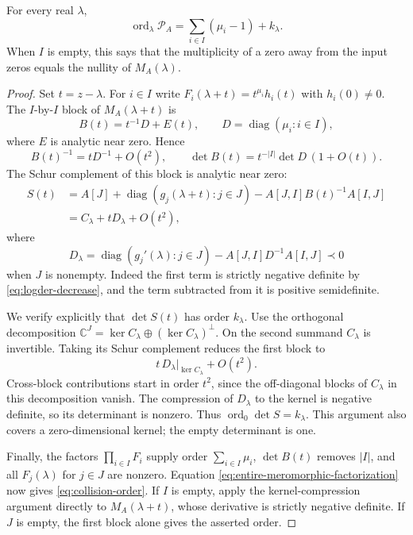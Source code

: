 \begin{theorem}\label{thm:collision-order}
For every real $\lambda$,
\begin{equation}\label{eq:collision-order}
 \boxed{\quad
 \operatorname{ord}_{\lambda}\mathcal P_A
    =\sum_{i\in I}(\mu_i-1)+k_\lambda .
 \quad}
\end{equation}
When $I$ is empty, this says that the multiplicity of a zero away from
the input zeros equals the nullity of $M_A(\lambda)$.
\end{theorem}
\begin{proof}
Set $t=z-\lambda$.  For $i\in I$ write
$F_i(\lambda+t)=t^{\mu_i}h_i(t)$ with $h_i(0)\neq0$.
The $I$-by-$I$ block of $M_A(\lambda+t)$ is
\[
 B(t)=t^{-1}D+E(t),\qquad
 D=\operatorname{diag}(\mu_i:i\in I),
\]
where $E$ is analytic near zero.  Hence
\[
 B(t)^{-1}=tD^{-1}+O(t^2),\qquad
 \det B(t)=t^{-|I|}\det D\,(1+O(t)).
\]
The Schur complement of this block is analytic near zero:
\begin{align*}
 S(t)&=A[J]+\operatorname{diag}(g_j(\lambda+t):j\in J)
                   -A[J,I]B(t)^{-1}A[I,J]\\
     &=C_\lambda+tD_\lambda+O(t^2),
\end{align*}
where
\begin{equation}\label{eq:collision-negative-derivative}
 D_\lambda=
   \operatorname{diag}(g_j'(\lambda):j\in J)
        -A[J,I]D^{-1}A[I,J]\prec0
\end{equation}
when $J$ is nonempty.  Indeed the first term is strictly negative
definite by \eqref{eq:logder-decrease}, and the term subtracted from it
is positive semidefinite.

We verify explicitly that $\det S(t)$ has order $k_\lambda$.
Use the orthogonal decomposition
$\mathbb C^J=\ker C_\lambda\oplus(\ker C_\lambda)^\perp$.
On the second summand $C_\lambda$ is invertible.  Taking its Schur
complement reduces the first block to
\[
 t\,D_\lambda|_{\ker C_\lambda}+O(t^2).
\]
Cross-block contributions start in order $t^2$, since the off-diagonal
blocks of $C_\lambda$ in this decomposition vanish.
The compression of $D_\lambda$ to the kernel is negative definite,
so its determinant is nonzero.  Thus
$\operatorname{ord}_0\det S=k_\lambda$.
This argument also covers a zero-dimensional kernel; the empty
determinant is one.

Finally, the factors $\prod_{i\in I}F_i$ supply order
$\sum_{i\in I}\mu_i$, $\det B(t)$ removes $|I|$, and all $F_j(\lambda)$
for $j\in J$ are nonzero.  Equation
\eqref{eq:entire-meromorphic-factorization} now gives
\eqref{eq:collision-order}.
If $I$ is empty, apply the kernel-compression argument directly to
$M_A(\lambda+t)$, whose derivative is strictly negative definite.
If $J$ is empty, the first block alone gives the asserted order.
\end{proof}

